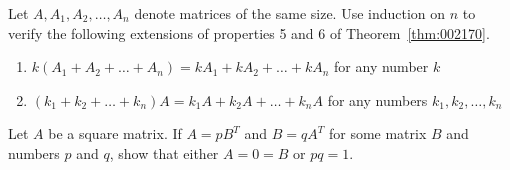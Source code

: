 \begin{multicols}{2}
\begin{ex}
Let $A, A_{1}, A_{2}, \dots, A_{n}$ denote matrices of the same size. Use induction on $n$ to verify the following extensions of properties 5 and 6 of Theorem~\ref{thm:002170}.


\begin{enumerate}[label={\alph*.}]
\item $k(A_{1} + A_{2} + \dots + A_{n}) = kA_{1} + kA_{2} + \dots + kA_{n}$ for any number $k$

\item $(k_{1} + k_{2} + \dots + k_{n})A = k_{1}A + k_{2}A + \dots + k_{n}A$ for any numbers $k_{1}, k_{2}, \dots, k_{n}$

\end{enumerate}
\end{ex}

\begin{ex}
Let $A$ be a square matrix. If $A = pB^{T}$ and $B = qA^{T}$ for some matrix $B$ and numbers $p$ and $q$, show that either $A = 0 = B$ or $pq = 1$. 
\end{ex}

\end{multicols}
